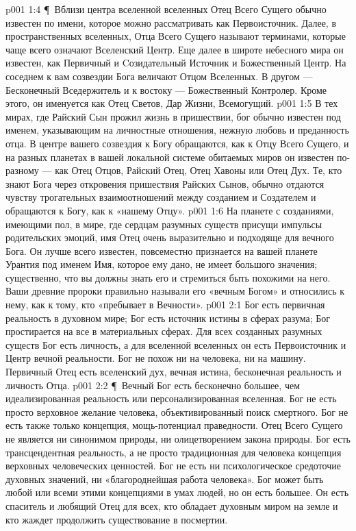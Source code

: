 \vs p001 1:4 \P\ Вблизи центра вселенной вселенных Отец Всего Сущего обычно известен по имени, которое можно рассматривать как Первоисточник. Далее, в пространственных вселенных, Отца Всего Сущего называют терминами, которые чаще всего означают Вселенский Центр. Еще далее в широте небесного мира он известен, как Первичный и Cозидательный Источник и Божественный Центр. На соседнем к вам созвездии Бога величают Отцом Вселенных. В другом --- Бесконечный Вседержитель и к востоку --- Божественный Контролер. Кроме этого, он именуется как Отец Светов, Дар Жизни, Всемогущий.
\vs p001 1:5 В тех мирах, где Райский Сын прожил жизнь в пришествии, бог обычно известен под именем, указывающим на личностные отношения, нежную любовь и преданность отца. В центре вашего созвездия к Богу обращаются, как к Отцу Всего Сущего, и на разных планетах в вашей локальной системе обитаемых миров он известен по\hyp{}разному --- как Отец Отцов, Райский Отец, Отец Хавоны или Отец Дух. Те, кто знают Бога через откровения пришествия Райских Сынов, обычно отдаются чувству трогательных взаимоотношений между созданием и Создателем и обращаются к Богу, как к «нашему Отцу».
\vs p001 1:6 На планете с созданиями, имеющими пол, в мире, где сердцам разумных существ присущи импульсы родительских эмоций, имя Отец очень выразительно и подходяще для вечного Бога. Он лучше всего известен, повсеместно признается на вашей планете Урантия под именем  Имя, которое ему дано, не имеет большого значения; существенно, что вы должны знать его и стремиться быть похожими на него. Ваши древние пророки правильно называли его «вечным Богом» и относились к нему, как к тому, кто «пребывает в Вечности».
\vs p001 2:1 Бог есть первичная реальность в духовном мире; Бог есть источник истины в сферах разума; Бог простирается на все в материальных сферах. Для всех созданных разумных существ Бог есть личность, а для вселенной вселенных он есть Первоисточник и Центр вечной реальности. Бог не похож ни на человека, ни на машину. Первичный Отец есть вселенский дух, вечная истина, бесконечная реальность и личность Отца.
\vs p001 2:2 \P\ Вечный Бог есть бесконечно большее, чем идеализированная реальность или персонализированная вселенная. Бог не есть просто верховное желание человека, объективированный поиск смертного. Бог не есть также только концепция, мощь\hyp{}потенциал праведности. Отец Всего Сущего не является ни синонимом природы, ни олицетворением закона природы. Бог есть трансцендентная реальность, а не просто традиционная для человека концепция верховных человеческих ценностей. Бог не есть ни психологическое средоточие духовных значений, ни «благороднейшая работа человека». Бог может быть любой или всеми этими концепциями в умах людей, но он есть большее. Он есть спаситель и любящий Отец для всех, кто обладает духовным миром на земле и кто жаждет продолжить существование в посмертии.
